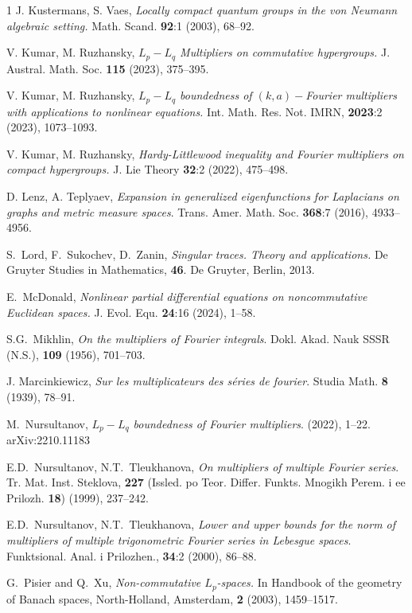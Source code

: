 \documentclass[a4paper,12pt]{amsart}
\numberwithin{equation}{section}
\theoremstyle{definition}
\begin{document}
\begin{thebibliography}{1}
 J. Kustermans, S. Vaes, \textit{Locally compact quantum groups in the von Neumann algebraic setting.} Math. Scand. \textbf{92}:1 (2003), 68--92. 

 V. Kumar, M. Ruzhansky, \textit{$L_p-L_q$ Multipliers on commutative hypergroups.} J. Austral. Math. Soc. \textbf{115} (2023), 375--395.

V. Kumar, M. Ruzhansky, \textit{$L_p-L_q$ boundedness of $(k,a)-$Fourier multipliers with applications to nonlinear equations.} Int. Math. Res. Not. IMRN, \textbf{2023}:2 (2023), 1073--1093.

 V. Kumar, M. Ruzhansky, \textit{Hardy-Littlewood inequality and Fourier multipliers on compact hypergroups.} J. Lie Theory \textbf{32}:2 (2022), 475--498.

 D. Lenz, A. Teplyaev, \textit{Expansion in generalized eigenfunctions for Laplacians on graphs and metric measure spaces}. Trans. Amer. Math. Soc. \textbf{368}:7 (2016), 4933--4956.

  S.~Lord, F.~Sukochev, D.~Zanin, \textit{Singular traces. Theory and applications.} De Gruyter Studies in Mathematics, {\bf 46}. De Gruyter, Berlin, 2013.
 

 E.~McDonald, \textit{Nonlinear partial differential equations on noncommutative Euclidean spaces.} J. Evol. Equ. \textbf{24}:16 (2024), 1--58.

 S.G.~Mikhlin, \textit{On the multipliers of Fourier integrals}. Dokl. Akad. Nauk SSSR (N.S.), \textbf{109} (1956), 701--703.


 J. Marcinkiewicz, \textit{Sur les multiplicateurs des s\'{e}ries de fourier}. Studia Math. \textbf{8} (1939), 78--91.


 M.~Nursultanov, \textit{$L_p-L_q$ boundedness of Fourier multipliers}. (2022), 1--22. arXiv:2210.11183

 E.D.~Nursultanov,  N.T.~Tleukhanova, \textit{On multipliers of multiple Fourier series}. Tr. Mat. Inst. Steklova, \textbf{227} (Issled. po Teor. Differ. Funkts. Mnogikh Perem. i ee Prilozh. \textbf{18}) (1999), 237--242.

 E.D.~Nursultanov,  N.T.~Tleukhanova, \textit{ Lower and upper bounds for the norm of multipliers of multiple trigonometric Fourier series in Lebesgue spaces}. Funktsional. Anal. i Prilozhen., \textbf{34}:2 (2000), 86--88.

 G.~Pisier and Q.~Xu, \textit{Non-commutative $L_p$-spaces.}  In Handbook of the geometry of Banach spaces, North-Holland, Amsterdam, \textbf{2} (2003), 1459--1517. 


\end{thebibliography}
\end{document}
